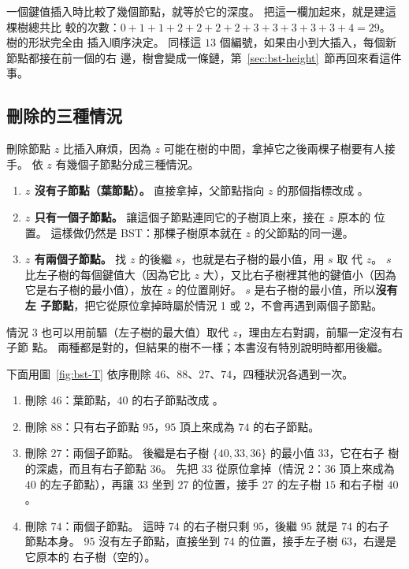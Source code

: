 一個鍵值插入時比較了幾個節點，就等於它的深度。 把這一欄加起來，就是建這棵樹總共比
較的次數：$0 + 1 + 1 + 2 + 2 + 2 + 2 + 3 + 3 + 3 + 3 + 3 + 4 = 29$。 樹的形狀完全由
插入順序決定。 同樣這 $13$ 個編號，如果由小到大插入，每個新節點都接在前一個的右
邊，樹會變成一條鏈，第~\ref{sec:bst-height}~節再回來看這件事。

\subsection{刪除的三種情況}

刪除節點 $z$ 比插入麻煩，因為 $z$ 可能在樹的中間，拿掉它之後兩棵子樹要有人接手。 依
$z$ 有幾個子節點分成三種情況。

\begin{enumerate}
\item \textbf{$z$ 沒有子節點（葉節點）。} 直接拿掉，父節點指向 $z$ 的那個指標改成
\NIL。
\item \textbf{$z$ 只有一個子節點。} 讓這個子節點連同它的子樹頂上來，接在 $z$ 原本的
位置。 這樣做仍然是 BST：那棵子樹原本就在 $z$ 的父節點的同一邊。
\item \textbf{$z$ 有兩個子節點。} 找 $z$ 的後繼 $s$，也就是右子樹的最小值，用 $s$ 取
代 $z$。 $s$ 比左子樹的每個鍵值大（因為它比 $z$ 大），又比右子樹裡其他的鍵值小（因為
它是右子樹的最小值），放在 $z$ 的位置剛好。 $s$ 是右子樹的最小值，所以\textbf{沒有左
子節點}，把它從原位拿掉時屬於情況 1 或 2，不會再遇到兩個子節點。
\end{enumerate}

情況 3 也可以用前驅（左子樹的最大值）取代 $z$，理由左右對調，前驅一定沒有右子節
點。 兩種都是對的，但結果的樹不一樣；本書沒有特別說明時都用後繼。

下面用圖~\ref{fig:bst-T} 依序刪除 $46$、$88$、$27$、$74$，四種狀況各遇到一次。

\begin{enumerate}
\item 刪除 $46$：葉節點，$40$ 的右子節點改成 \NIL。
\item 刪除 $88$：只有右子節點 $95$，$95$ 頂上來成為 $74$ 的右子節點。
\item 刪除 $27$：兩個子節點。 後繼是右子樹 $\{40, 33, 36\}$ 的最小值 $33$，它在右子
樹的深處，而且有右子節點 $36$。 先把 $33$ 從原位拿掉（情況 2：$36$ 頂上來成為
$40$ 的左子節點），再讓 $33$ 坐到 $27$ 的位置，接手 $27$ 的左子樹 $15$ 和右子樹
$40$。
\item 刪除 $74$：兩個子節點。 這時 $74$ 的右子樹只剩 $95$，後繼 $95$ 就是 $74$ 的右子
節點本身。 $95$ 沒有左子節點，直接坐到 $74$ 的位置，接手左子樹 $63$，右邊是它原本的
右子樹（空的）。
\end{enumerate}


